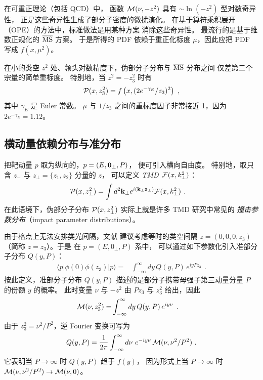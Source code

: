在可重正理论（包括 QCD）中，
函数 $ {\cal M} (\nu, -z^2)  $
具有 $\sim \ln (-z^2)$ 型对数奇异性，
正是这些奇异性生成了部分子密度的微扰演化。
在基于算符乘积展开（OPE）的方法中，标准做法是用某种方案
消除这些奇异性。
最流行的是基于维数正规化的 $\overline{\rm MS}$ 方案。
于是所得的 PDF 依赖于重正化标度 $\mu$，因此应把 PDF 写成 $f(x, \mu^2)$。

在小的类空 $z^2$ 处、领头对数精度下，伪部分子分布与 $\overline{\rm MS}$ 分布之间
仅差第二个宗量的简单重标度。
特别地，当 $z^2=-z_3^2$ 时有
\begin{align}
    {\cal P} (x, z_3^2) = f \left (x, (2 e^{-\gamma_E}/ z_3)^2 \right )
  \  ,
\label{Ptof}
\end{align}
其中 $\gamma_E$ 是 Euler 常数。
$\mu$ 与 $1/z_3$ 之间的重标度因子非常接近 1，因为 \mbox{$2e^{-\gamma_E}=1.12$}。


\subsection{横动量依赖分布与准分布}

把靶动量 $p$ 取为纵向的，\mbox{$p= (E, {\bf 0}_\perp, P)$}，
便可引入横向自由度。
特别地，取只含 $z_-$ 与 \mbox{$z_\perp= \{z_1,z_2\}$} 分量的 $z$，
可以定义 {\it TMD}\ ${\cal F} (x, k_\perp^2)$：
      \begin{align}
 {\cal P} (x,  z_\perp^2)
&   =
    \int  d^2{\bf k}_\perp   e^{i ({\bf k}_\perp {\bf z}_\perp)}
      {\cal F} (x, {k}_\perp^2)
 \   .
  \label{MTMD0}
\end{align}
在此语境下，伪部分子分布 $ {\cal P} (x,  z_\perp^2) $ 实际上就是许多 TMD 研究中常见的
{\it 撞击参数分布}（impact parameter distributions）。


由于格点上无法安排类光间隔，文献 \cite{Ji:2013dva} 建议考虑等时的类空间隔
$z= (0,0,0,z_3)$（简称 \mbox{$z=z_3$}）。于是
在 \mbox{$p=(E, 0_\perp, P)$} 系中，
可以通过如下参数化引入准部分子分布 $Q(y, P)$：
  \begin{align}
  \langle p |   \phi(0) \phi (z_3)|p \rangle %
=  &
\int_{-\infty}^{\infty}   dy \,
 Q(y, P) \,  e^{i y  P z_3 } \,
 \  .
 \label{newVDFxzQ}
\end{align}
按此定义，准部分子分布 $Q(y,P)$ 描述的是部分子携带母强子第三动量分量 $P$
的份额 $y$ 的概率。
此时变量 $\nu$ 与 $-z^2$ 由 $Pz_3$ 与 $z_3^2$ 给出，因此
 \begin{align}
{\cal M} (\nu,z_3^2)
=  &
\int_{-\infty}^{\infty}   dy \,
 Q(y, P) \,  e^{i y  \nu } \,
 \  .
\end{align}
由于 $z_3^2= \nu^2/P^2$，逆 Fourier 变换可写为
\begin{align}
  Q(y,  P)   =\frac{1}{2 \pi}  \int_{-\infty}^{\infty}  d\nu \,
   \, e^{-i y  \nu}  \, {\cal M} (\nu,  \nu^2/P^2)    \  .
\label{IxM}
\end{align}
它表明当 $P \to \infty$ 时 $Q(y,  P) $ 趋于 $f(y)$，
因为形式上当 \mbox{$P \to \infty$} 时
${\cal M} (\nu,  \nu^2/P^2) \to {\cal M} (\nu, 0)$。

